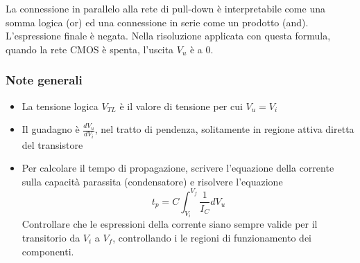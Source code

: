\documentclass{article}
\begin{document}
La connessione in parallelo alla rete di pull-down è interpretabile come una somma logica (or) ed una connessione in serie come un prodotto (and).
L'espressione finale è negata.
Nella risoluzione applicata con questa formula, quando la rete CMOS è spenta, l'uscita $V_u$ è a 0.

\subsubsection*{Note generali}
\begin{itemize}
    \item La tensione logica $V_{TL}$ è il valore di tensione per cui $V_u = V_i$
    \item Il guadagno è $\frac{dV_u}{dV_i}$, nel tratto di pendenza, solitamente in regione attiva diretta del transistore
    \item Per calcolare il tempo di propagazione, scrivere l'equazione della corrente sulla capacità parassita (condensatore) e risolvere l'equazione
        \[
            t_p = C \int_{V_i}^{V_f} \frac{1}{I_C} dV_u
        \]
    Controllare che le espressioni della corrente siano sempre valide per il transitorio da $V_i$ a $V_f$, controllando i le regioni di funzionamento dei componenti.
\end{itemize}
\end{document}
